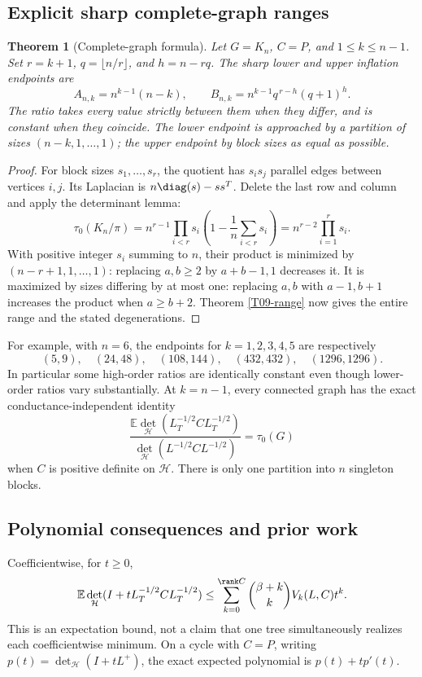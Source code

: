 \documentclass[11pt,a4paper]{article}
\newtheorem{theorem}{Theorem}[section]
\theoremstyle{definition}\newtheorem{definition}[theorem]{Definition}
\theoremstyle{remark}\newtheorem{remark}[theorem]{Remark}
\numberwithin{equation}{section}
\begin{document}
\subsection{Explicit sharp complete-graph ranges}\label{T09-sec-4}
\begin{theorem}[Complete-graph formula]\label{T09-complete}
Let $G=K_n$, $C=P$, and $1\le k\le n-1$. Set $r=k+1$, $q=\lfloor n/r\rfloor$, and $h=n-rq$. The sharp lower and upper inflation endpoints are
\[
 A_{n,k}=n^{k-1}(n-k),\qquad
 B_{n,k}=n^{k-1}q^{\,r-h}(q+1)^h.
\]
The ratio takes every value strictly between them when they differ, and is constant when they coincide. The lower endpoint is approached by a partition of sizes $(n-k,1,\ldots,1)$; the upper endpoint by block sizes as equal as possible.
\end{theorem}
\begin{proof}
For block sizes $s_1,\ldots,s_r$, the quotient has $s_i s_j$ parallel edges between vertices $i,j$. Its Laplacian is $n\diag(s)-ss^T$. Delete the last row and column and apply the determinant lemma:
\[
 \tau_0(K_n/\pi)
 =n^{r-1}\prod_{i<r}s_i\left(1-\frac1n\sum_{i<r}s_i\right)
 =n^{r-2}\prod_{i=1}^r s_i.
\]
With positive integer $s_i$ summing to $n$, their product is minimized by $(n-r+1,1,\ldots,1)$: replacing $a,b\ge2$ by $a+b-1,1$ decreases it. It is maximized by sizes differing by at most one: replacing $a,b$ with $a-1,b+1$ increases the product when $a\ge b+2$. Theorem \ref{T09-range} now gives the entire range and the stated degenerations.
\end{proof}
For example, with $n=6$, the endpoints for $k=1,2,3,4,5$ are respectively
\[
 (5,9),\quad(24,48),\quad(108,144),\quad(432,432),\quad(1296,1296).
\]
In particular some high-order ratios are identically constant even though lower-order ratios vary substantially. At $k=n-1$, every connected graph has the exact conductance-independent identity
\[
 \frac{\mathbb E\det_{\mathcal H}(L_T^{-1/2}CL_T^{-1/2})}
 {\det_{\mathcal H}(L^{-1/2}CL^{-1/2})}=\tau_0(G)
\]
when $C$ is positive definite on $\mathcal H$. There is only one partition into $n$ singleton blocks.

\subsection{Polynomial consequences and prior work}\label{T09-sec-5}
Coefficientwise, for $t\ge0$,
\[
 \mathbb E\det_{\mathcal H}(I+tL_T^{-1/2}CL_T^{-1/2})
 \le\sum_{k=0}^{\rank C}\binom{\beta+k}{k}V_k(L,C)t^k.
\]
This is an expectation bound, not a claim that one tree simultaneously realizes each coefficientwise minimum. On a cycle with $C=P$, writing $p(t)=\det_{\mathcal H}(I+tL^+)$, the exact expected polynomial is $p(t)+tp'(t)$.
\end{document}
